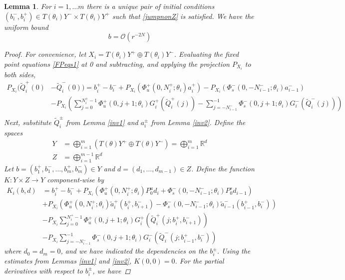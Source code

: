 \documentclass[12pt]{elsarticle}
\def\R{{\mathbb R}}
\newtheorem{lemma}{Lemma}
\begin{document}
\begin{lemma}\label{inv3nt}
For $i = 1, \dots m$ there is a unique pair of initial conditions $(b_i^-, b_i^+) \in T(\theta_i) Y^- \times T(\theta_i) Y^+$ such that \eqref{jumpnonZ} is satisfied. We have the uniform bound
\begin{equation}\label{bboundnt}
b = \mathcal{O}(r^{-2N})
\end{equation}

\begin{proof}
For convenience, let $X_i = T(\theta_i)Y^+ \oplus T(\theta_i)Y^-$. Evaluating the fixed point equations \eqref{FPeqs1} at 0 and subtracting, and applying the projection $P_{X_i}$ to both sides, 
\begin{align*}
P_{X_i}( \tilde{Q}_i^+(0) &- \tilde{Q}_i^-(0)) = b_i^+ - b_i^- 
+ P_{X_i}( \Phi_u^+(0, N_i^+; \theta_i) a_i^+) - P_{X_i}( \Phi_s^-(0, -N_{i-1}^-; \theta_i) a_{i-1}^-)  \\
&- P_{X_i} \left( \sum_{j = 0}^{N_i^+-1} \Phi_u^+(0, j+1; \theta_i) G_i^+(\tilde{Q}_i^+(j)) 
- \sum_{j = -N_{i-1}^-}^{-1} \Phi_s^-(0, j+1; \theta_i) G_i^-(\tilde{Q}_i^-(j)) \right) \\
\end{align*}
Next, substitute $\tilde{Q}_i^\pm$ from Lemma \ref{inv1} and $a_i^\pm$ from Lemma \ref{inv2}. Define the spaces
\begin{align}\label{spaceYt}
Y &= \bigoplus_{i=1}^m (T(\theta) Y^+ \oplus T(\theta) Y^-) = \bigoplus_{i=1}^m \R^d \\
Z &= \bigoplus_{i=1}^{m-1} \R^d
\end{align}
Let $b = (b_1^+, b_1^-, \dots, b_m^+, b_m^-) \in Y$ and $d = (d_1, \dots, d_{m-1}) \in Z$. Define the function $K: Y \times Z \rightarrow Y$ component-wise by
\begin{align*}
K_i(b, d) &= 
 b_i^+ - b_i^- + P_{X_i} \left( \Phi_u^+(0, N_i^+; \theta_i) P_0^u d_i + \Phi_s^-(0, -N_{i-1}^-; \theta_i) P_0^s d_{i-1} \right) \\
&+ P_{X_i}\left( \Phi_u^+(0, N_i^+; \theta_i) \tilde{a}_i^+(b_i^+, b_{i+1}^-) 
- \Phi_s^-(0, -N_{i-1}^-; \theta_i) \tilde{a}_{i-1}^-(b_{i-1}^+, b_i^-) \right) \\
&- P_{X_i} \sum_{j = 0}^{N_i^+-1} \Phi_u^+(0, j+1; \theta_i) G_i^+(\tilde{Q}_i^+(j; b_i^+, b_{i+1}^-)) \\
&- P_{X_i} \sum_{j = -N_{i-1}^-}^{-1} \Phi_s^-(0, j+1; \theta_i) G_i^-(\tilde{Q}_i^-(j; b_{i-1}^+, b_i^-))
\end{align*}
where $d_0 = d_m = 0$, and we have indicated the dependencies on the $b_i^\pm$. Using the estimates from Lemmas \ref{inv1} and \ref{inv2}, $K(0, 0) = 0$. For the partial derivatives with respect to $b_i^\pm$, we have

\end{proof}
\end{lemma}
\end{document}
